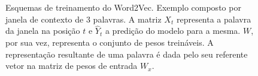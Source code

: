 \begin{figure}
    \centering
    \qquad
    \caption{Esquemas de treinamento do Word2Vec. Exemplo composto por janela de
             contexto de 3 palavras. A matriz $X_t$ representa a palavra da
             janela na posição $t$ e $\hat{Y}_t$ a predição do modelo para a
             mesma. $W$, por sua vez, representa o conjunto de pesos treináveis.
             A representação resultante de uma palavra é dada pelo seu referente
             vetor na matriz de pesos de entrada $W_x$.}%
    \label{fig:w2v}
\end{figure}

